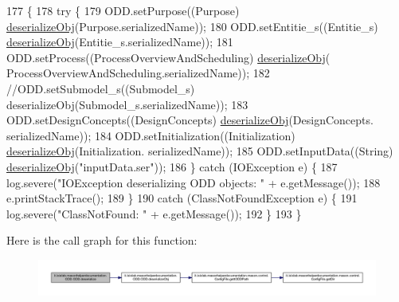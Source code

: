\begin{DoxyCode}
177                                     \{
178         \textcolor{keywordflow}{try} \{
179             ODD.setPurpose((Purpose) \hyperlink{classit_1_1isislab_1_1masonhelperdocumentation_1_1_o_d_d_1_1_o_d_d_aa78df716eeec3477e70f23918ca29b6b}{deserializeObj}(Purpose.serializedName));
180             ODD.setEntitie\_s((Entitie\_s) \hyperlink{classit_1_1isislab_1_1masonhelperdocumentation_1_1_o_d_d_1_1_o_d_d_aa78df716eeec3477e70f23918ca29b6b}{deserializeObj}(Entitie\_s.serializedName));
181             ODD.setProcess((ProcessOverviewAndScheduling) \hyperlink{classit_1_1isislab_1_1masonhelperdocumentation_1_1_o_d_d_1_1_o_d_d_aa78df716eeec3477e70f23918ca29b6b}{deserializeObj}(
      ProcessOverviewAndScheduling.serializedName));
182             \textcolor{comment}{//ODD.setSubmodel\_s((Submodel\_s) deserializeObj(Submodel\_s.serializedName));}
183             ODD.setDesignConcepts((DesignConcepts) \hyperlink{classit_1_1isislab_1_1masonhelperdocumentation_1_1_o_d_d_1_1_o_d_d_aa78df716eeec3477e70f23918ca29b6b}{deserializeObj}(DesignConcepts.
      serializedName));
184             ODD.setInitialization((Initialization) \hyperlink{classit_1_1isislab_1_1masonhelperdocumentation_1_1_o_d_d_1_1_o_d_d_aa78df716eeec3477e70f23918ca29b6b}{deserializeObj}(Initialization.
      serializedName));
185             ODD.setInputData((String) \hyperlink{classit_1_1isislab_1_1masonhelperdocumentation_1_1_o_d_d_1_1_o_d_d_aa78df716eeec3477e70f23918ca29b6b}{deserializeObj}(\textcolor{stringliteral}{"inputData.ser"}));
186         \} \textcolor{keywordflow}{catch} (IOException e) \{
187             log.severe(\textcolor{stringliteral}{"IOException deserializing ODD objects: "} + e.getMessage());
188             e.printStackTrace();
189         \}
190         \textcolor{keywordflow}{catch} (ClassNotFoundException e) \{
191             log.severe(\textcolor{stringliteral}{"ClassNotFound: "} + e.getMessage());
192         \}
193     \}
\end{DoxyCode}


Here is the call graph for this function\-:
\nopagebreak
\begin{figure}[H]
\begin{center}
\leavevmode
\includegraphics[width=350pt]{classit_1_1isislab_1_1masonhelperdocumentation_1_1_o_d_d_1_1_o_d_d_aef969a9a32bbae5c690470582581220e_cgraph}
\end{center}
\end{figure}


